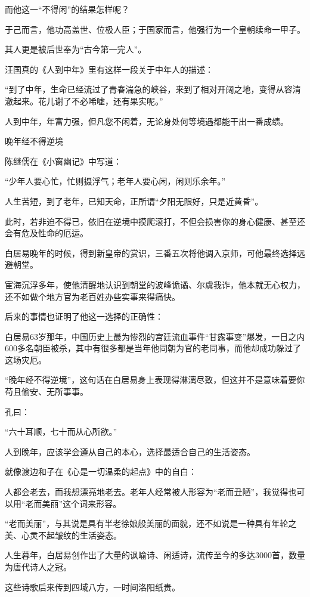 \documentclass[11pt]{ctexart}
\begin{document}
{{{{而他这一“不得闲”的结果怎样呢？

于己而言，他功高盖世、位极人臣；于国家而言，他强行为一个皇朝续命一甲子。

其人更是被后世奉为“古今第一完人”。

汪国真的《人到中年》里有这样一段关于中年人的描述：

“到了中年，生命已经流过了青春湍急的峡谷，来到了相对开阔之地，变得从容清澈起来。花儿谢了不必唏嘘，还有果实呢。”

人到中年，年富力强，但凡您不闲着，无论身处何等境遇都能干出一番成绩。





晚年经不得逆境

陈继儒在《小窗幽记》中写道：

“少年人要心忙，忙则摄浮气；老年人要心闲，闲则乐余年。”

人生苦短，到了老年，已知天命，正所谓“夕阳无限好，只是近黄昏”。

此时，若非迫不得已，依旧在逆境中摸爬滚打，不但会损害你的身心健康、甚至还会有危及性命的厄运。

白居易晚年的时候，得到新皇帝的赏识，三番五次将他调入京师，可他最终选择远避朝堂。

宦海沉浮多年，使他清醒地认识到朝堂的波峰诡谲、尔虞我诈，他本就无心权力，还不如做个地方官为老百姓办些实事来得痛快。

后来的事情也证明了他这一选择的正确性：

白居易63岁那年，中国历史上最为惨烈的宫廷流血事件“甘露事变”爆发，一日之内600多名朝臣被杀，其中有很多都是当年他同朝为官的老同事，而他却成功躲过了这场灾厄。

“晚年经不得逆境”，这句话在白居易身上表现得淋漓尽致，但这并不是意味着要你苟且偷安、无所事事。

孔曰：

“六十耳顺，七十而从心所欲。”

人到晚年，应该学会遵从自己的本心，选择最适合自己的生活姿态。

就像渡边和子在《心是一切温柔的起点》中的自白：

人都会老去，而我想漂亮地老去。老年人经常被人形容为“老而丑陋”，我觉得也可以用“老而美丽”这个词来形容。

“老而美丽”，与其说是具有半老徐娘般美丽的面貌，还不如说是一种具有年轮之美、心灵不起皱纹的生活姿态。

人生暮年，白居易创作出了大量的讽喻诗、闲适诗，流传至今的多达3000首，数量为唐代诗人之冠。

这些诗歌后来传到四域八方，一时间洛阳纸贵。

}}}}
\end{document}
